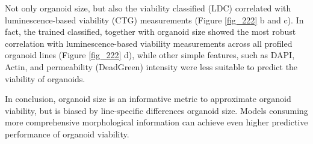 \begin{flushleft}
\bigbreak
Not only organoid size, but also the viability classified (LDC) correlated with luminescence-based viability (CTG) measurements (Figure \ref{fig_222} b and c). In fact, the trained classified, together with organoid size showed the most robust correlation with luminescence-based viability measurements across all profiled organoid lines (Figure \ref{fig_222} d), while other simple features, such as DAPI, Actin, and permeability (DeadGreen) intensity were less suitable to predict the viability of organoids. 

\bigbreak
In conclusion, organoid size is an informative metric to approximate organoid viability, but is biased by line-specific differences organoid size. Models consuming more comprehensive morphological information can achieve even higher predictive performance of organoid viability. 


\end{flushleft}
